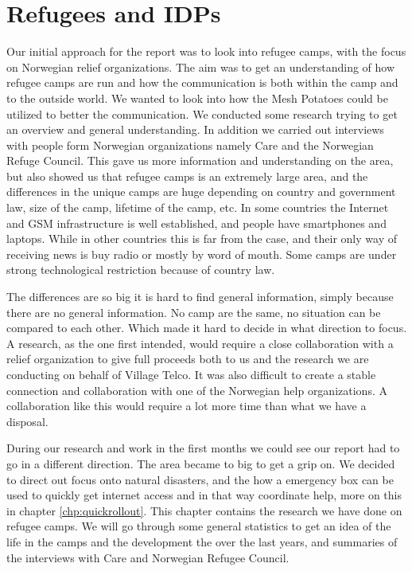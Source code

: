 \chapter{Refugees and IDPs}
\label{chp:refugeecamps} 
Our initial approach for the report was to look into refugee camps, with the focus on Norwegian relief organizations. The aim was to get an understanding of how refugee camps are run and how the communication is both within the camp and to the outside world. We wanted to look into how the Mesh Potatoes could be utilized to better the communication. We conducted some research trying to get an overview and general understanding. In addition we carried out interviews with people form Norwegian organizations namely Care and the Norwegian Refuge Council. This gave us more information and understanding on the area, but also showed us that refugee camps is an extremely large area, and the differences in the unique camps are huge depending on country and government law, size of the camp, lifetime of the camp, etc. In some countries the Internet and GSM infrastructure is well established, and people have smartphones and laptops. While in other countries this is far from the case, and their only way of receiving news is buy radio or mostly by word of mouth. Some camps are under strong technological restriction because of country law. 

The differences are so big it is hard to find general information, simply because there are no general information. No camp are the same, no situation can be compared to each other. Which made it hard to decide in what direction to focus. A research, as the one first intended, would require a close collaboration with a relief organization to give full proceeds both to us and the research we are conducting on behalf of Village Telco. It was also difficult to create a stable connection and collaboration with one of the Norwegian help organizations. A collaboration like this would require a lot more time than what we have a disposal. 
  
During our research and work in the first months we could see our report had to go in a different direction. The area became to big to get a grip on. We decided to direct out focus onto natural disasters, and the how a emergency box can be used to quickly get internet access and in that way coordinate help, more on this in chapter \ref{chp:quickrollout}.
This chapter contains the research we have done on refugee camps. We will go through some general statistics to get an idea of the life in the camps and the development the over the last years, and summaries of the interviews with Care and Norwegian Refugee Council.

